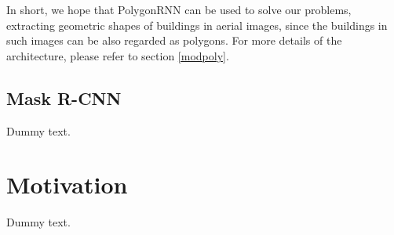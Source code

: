 In short, we hope that PolygonRNN can be used to solve our problems, extracting geometric shapes of buildings in aerial images, since the buildings in such images can be also regarded as polygons. For more details of the architecture, please refer to section \ref{modpoly}.

\subsection{Mask R-CNN}\label{relatrcnn}

Dummy text.

\section{Motivation}\label{relatmot}

Dummy text.

